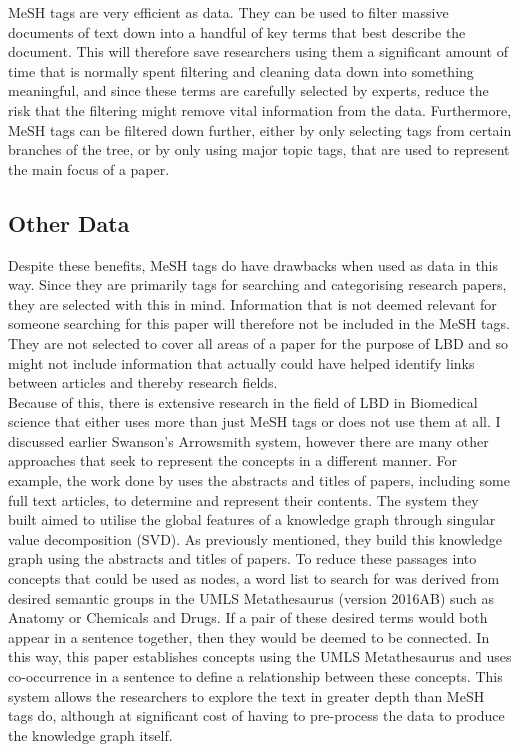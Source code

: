 \documentclass{l4proj}
\begin{document}
MeSH tags are very efficient as data. They can be used to filter massive documents of text down into a handful of key terms that best describe the document. This will therefore save researchers using them a significant amount of time that is normally spent filtering and cleaning data down into something meaningful, and since these terms are carefully selected by experts, reduce the risk that the filtering might remove vital information from the data. Furthermore, MeSH tags can be filtered down further, either by only selecting tags from certain branches of the tree, or by only using major topic tags, that are used to represent the main focus of a paper. \\

\subsection{Other Data}

Despite these benefits, MeSH tags do have drawbacks when used as data in this way. Since they are primarily tags for searching and categorising research papers, they are selected with this in mind. Information that is not deemed relevant for someone searching for this paper will therefore not be included in the MeSH tags. They are not selected to cover all areas of a paper for the purpose of LBD and so might not include information that actually could have helped identify links between articles and thereby research fields. \\
 
Because of this, there is extensive research in the field of LBD in Biomedical science that either uses more than just MeSH tags or does not use them at all. I discussed earlier Swanson's Arrowsmith system, however there are many other approaches that seek to represent the concepts in a different manner. For example, the work done by \cite{lever_collaborative_2018} uses the abstracts and titles of papers, including some full text articles, to determine and represent their contents. The system they built aimed to utilise the global features of a knowledge graph through singular value decomposition (SVD). As previously mentioned, they build this knowledge graph using the abstracts and titles of papers. To reduce these passages into concepts that could be used as nodes, a word list to search for was derived from desired semantic groups in the UMLS Metathesaurus (version 2016AB) such as Anatomy or Chemicals and Drugs. If a pair of these desired terms would both appear in a sentence together, then they would be deemed to be connected. In this way, this paper establishes concepts using the UMLS Metathesaurus and uses co-occurrence in a sentence to define a relationship between these concepts. This system allows the researchers to explore the text in greater depth than MeSH tags do, although at significant cost of having to  pre-process the data to produce the knowledge graph itself. \\ 
\end{document}
